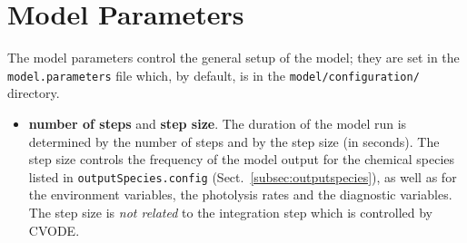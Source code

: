 \section{Model Parameters} \label{sec:model-parameters}

The model parameters control the general setup of the model; they are
set in the \texttt{model.parameters} file which, by default, is
in the \texttt{model/configuration/} directory.

\begin{itemize}
\item \textbf{number of steps} and \textbf{step size}. The duration of
  the model run is determined by the number of steps and by the step
  size (in seconds). The step size controls the frequency of the model
  output for the chemical species listed in \texttt{outputSpecies.config}
  (Sect.~\ref{subsec:outputspecies}), as well as for the environment
  variables, the photolysis rates and the diagnostic variables. The
  step size is \emph{not related} to the integration step which is
  controlled by CVODE.


\end{itemize}
